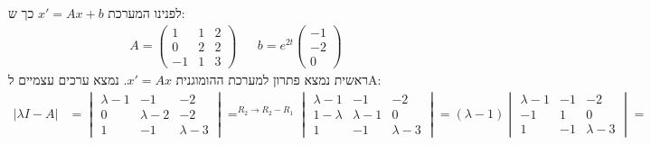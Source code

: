 \documentclass{article}
\DeclareMathOperator*{\equals}{=}
\begin{document}
לפנינו המערכת $x'=Ax+b$ כך ש:
\begin{align*}
    A=\begin{pmatrix}
          1  & 1 & 2 \\
          0  & 2 & 2 \\
          -1 & 1 & 3
      \end{pmatrix} &  & b=e^{2t}\begin{pmatrix}
                                     -1 \\
                                     -2 \\
                                     0
                                 \end{pmatrix}
\end{align*}
ראשית נמצא פתרון למערכת ההומוגנית $x'=Ax$. נמצא ערכים עצמיים לA:
\begin{align*}
    |\lambda I - A| & =\begin{vmatrix}
                           \lambda-1 & -1        & -2        \\
                           0         & \lambda-2 & -2        \\
                           1         & -1        & \lambda-3
                       \end{vmatrix}\equals^{R_2\rightarrow R_2-R_1}\begin{vmatrix}
                                                                        \lambda-1 & -1        & -2        \\
                                                                        1-\lambda & \lambda-1 & 0         \\
                                                                        1         & -1        & \lambda-3
                                                                    \end{vmatrix}=(\lambda-1)\begin{vmatrix}
                                                                                                 \lambda-1 & -1 & -2        \\
                                                                                                 -1        & 1  & 0         \\
                                                                                                 1         & -1 & \lambda-3
                                                                                             \end{vmatrix}= \\

\end{align*}
\end{document}
